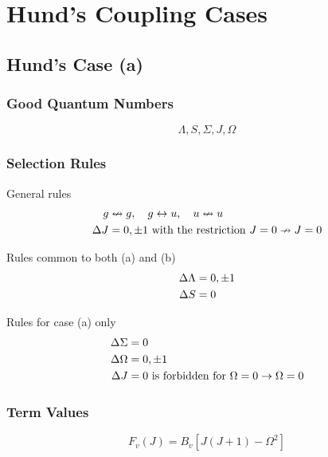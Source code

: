 \chapter{Hund's Coupling Cases}
\label{c:hunds_coupling_cases}

\section{Hund's Case (a)}
\label{s:hunds_case_a}

\subsection{Good Quantum Numbers}

\begin{equation*}
    \Lambda, S, \Sigma, J, \Omega
\end{equation*}

\subsection{Selection Rules}

General rules
\begin{align*}
    g        & \nleftrightarrow g, \quad g \leftrightarrow u, \quad u \nleftrightarrow u \\
    \adif{J} & = 0, \pm 1 \text{ with the restriction } J = 0 \nrightarrow J = 0
\end{align*}

Rules common to both (a) and (b)
\begin{align*}
    \adif{\Lambda} & = 0, \pm 1 \\
    \adif{S}       & = 0
\end{align*}

Rules for case (a) only
\begin{align*}
    \adif{\Sigma} & = 0                                                             \\
    \adif{\Omega} & = 0, \pm 1                                                      \\
    \adif{J}      & = 0 \text{ is forbidden for } \Omega = 0 \rightarrow \Omega = 0
\end{align*}

\subsection{Term Values}

\begin{equation*}
    F_v(J) = B_v[J(J + 1) - \Omega^2]
\end{equation*}


